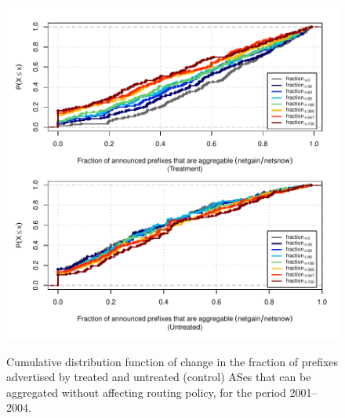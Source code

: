 \begin{figure}[H]
\begin{centering}
\begin{singlespace}
    \includegraphics[width=6in]{figures/behavior-frac_deagg-2001_2004-corr.pdf}
    \vspace{-2em}\\
    \caption{Cumulative distribution function of change in the fraction of prefixes advertised by treated and untreated (control) ASes that can be aggregated without affecting routing policy, for the period 2001--2004.}
\end{singlespace}
\end{centering}
\end{figure}
